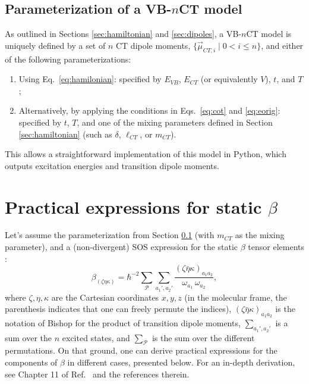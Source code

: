 \documentclass[12pt,a4paper]{article}
\begin{document}
\subsection{Parameterization of a VB-$n$CT model} \label{sec:param}

As outlined in Sections \ref{sec:hamiltonian} and \ref{sec:dipoles}, a VB-$n$CT model is uniquely defined by a set of $n$ CT dipole moments, $\{\vec{\mu}_{CT,i} \mid 0 < i \leq n\}$, and either of the following parameterizations:
\begin{enumerate}
	\item Using Eq.~\eqref{eq:hamilonian}: specified by $E_{VB}$, $E_{CT}$ (or equivalently $V$), $t$, and $T$;
	\item Alternatively, by applying the conditions in Eqs.~\eqref{eq:cot} and \eqref{eq:eorig}: specified by $t$, $T$, and one of the mixing parameters defined in Section \ref{sec:hamiltonian} (such as $\delta$, $\ell_{CT}$, or $m_{CT}$).
\end{enumerate}
This allows a straightforward implementation of this model in Python, which outputs excitation energies and transition dipole moments.


\clearpage
\appendix
\setcounter{equation}{0} 
\renewcommand{\theequation}{A\arabic{equation}}

\section{Practical expressions for static $\beta$}

Let's assume the parameterization from Section \ref{sec:param} (with $m_{CT}$ as the mixing parameter), and a (non-divergent) SOS expression  for the static $\beta$ tensor elements \cite{bishopExplicitNondivergentFormulas1994}:\begin{equation}
	\beta_{(\zeta\eta\kappa)} = \hbar^{-2} \sum_\mathcal{P} \sum_{a_1', a_2'} \frac{(\zeta\bar{\eta}\kappa)_{a_1 a_2}}{\omega_{a_1}\,\omega_{a_2}},\label{eq:sos}
\end{equation}
where $\zeta, \eta, \kappa$ are the Cartesian coordinates $x, y, z$ (in the molecular frame, the parenthesis indicates that one can freely permute the indices), $(\zeta\bar{\eta}\kappa)_{a_1 a_2}$ is the notation of Bishop for the product of transition dipole moments, $\sum_{a_1', a_2'}$ is a sum over the $n$ excited states, and $\sum_{\mathcal{P}}$ is the sum over the different permutations. On that ground, one  can derive practical expressions for the components of $\beta$ in different cases, presented below. For an in-depth derivation, see Chapter 11 of Ref.~\cite{mythesis} and the references therein.
\end{document}
